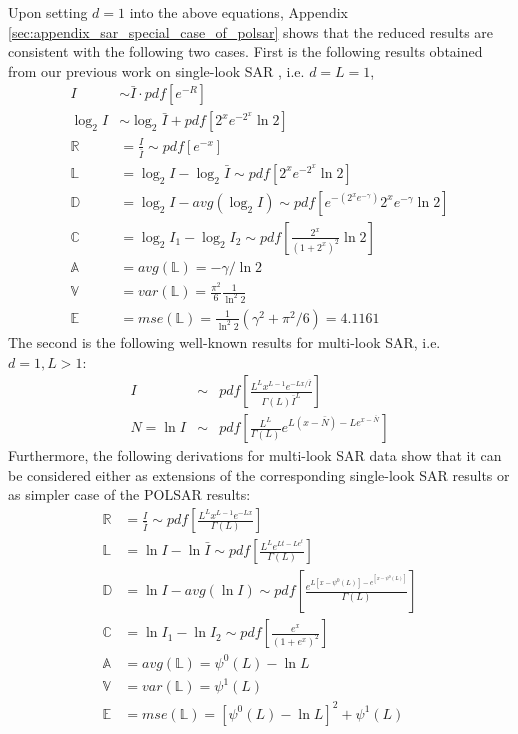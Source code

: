 \documentclass[journal]{IEEEtran}
\begin{document}
Upon setting $d=1$ into the above equations,
  Appendix \ref{sec:appendix_sar_special_case_of_polsar} shows that the reduced results are consistent with the following two cases.
First is the following results obtained from our previous work on single-look SAR \cite{Le_2010_ACRS} , i.e. $d=L=1$,
\begin{align*}
  I &\sim \bar{I} \cdot pdf \left[ e^{-R} \right] \\
  \log_2{I} &\sim \log_2{\bar{I}} + pdf \left[ 2^xe^{-2^x}\ln2 \right] \\
  \mathbb{R} &= \frac{I}{\bar{I}} \sim pdf \left[ e^{-x} \right]  \\
  \mathbb{L} &= \log_2{I} - \log_2{\bar{I}} \sim pdf \left[ 2^xe^{-2^x}\ln2 \right]\\
  \mathbb{D} &= \log_2{I} - avg(\log_2{I}) \sim pdf \left[ e^{-(2^xe^{-\gamma})} 2^xe^{-\gamma} \ln2 \right] \\
  \mathbb{C} &= \log_2{I_1} - \log_2{I_2} \sim pdf \left[ \frac{2^x}{(1+2^x)^2} \ln2 \right] \\
  \mathbb{A} &= avg(\mathbb{L}) = -\gamma / \ln{2} \\
  \mathbb{V} &= var(\mathbb{L}) = \frac{\pi^2}{6} \frac{1}{ \ln^2{2}} \\
  \mathbb{E} &= mse(\mathbb{L}) = \frac{1}{\ln^2{2}}( \gamma^2 + \pi^2/6 ) = 4.1161 
\end{align*}
The second is the following well-known results for multi-look SAR, i.e. $d=1,L>1$:
  \begin{eqnarray}
I &\sim& pdf \left[ \frac{L^L x^{L-1} e^{-Lx/\bar{I}}}{\Gamma(L) \bar{I}^L} \right] \\
N = \ln{I} &\sim& pdf \left[ \frac{L^L}{\Gamma(L)} e^{L(x-\bar{N})-Le^{x-\bar{N}}} \right]
  \end{eqnarray}
Furthermore, the following derivations for multi-look SAR data
   show that it can be considered 
    either as extensions of the corresponding single-look SAR results
    or as simpler case of the POLSAR results:
  \begin{align*}
    \mathbb{R} &= \frac{I}{\bar{I}} \sim pdf \left[ \frac{ L^{L} x^{L-1} e^{-Lx}}{ \Gamma(L)} \label{eqn:multi_look_SAR_ratio_dist} \right]\\
    \mathbb{L} &= \ln{I} - \ln{\bar{I}} \sim pdf \left[ \frac{L^Le^{Lt-Le^t}}{ \Gamma(L)}  \right] \\
    \mathbb{D} &= \ln{I} - avg(\ln{I}) \sim pdf \left[ \frac{e^{L[x-\psi^0(L)]-e^{[x-\psi^0(L)]}}}{\Gamma(L)} \right] \\
    \mathbb{C} &= \ln{I_1} - \ln{I_2} \sim pdf \left[ \frac{e^{x}}{(1+e^x)^{2}} \right] \\
    \mathbb{A} &= avg(\mathbb{L}) = \psi^0(L) - \ln{L} \\
    \mathbb{V} &= var(\mathbb{L}) = \psi^1(L) \\
    \mathbb{E} &= mse(\mathbb{L}) = \left[ \psi^0(L) - \ln{L} \right]^2 + \psi^1(L)
  \end{align*}
\end{document}
